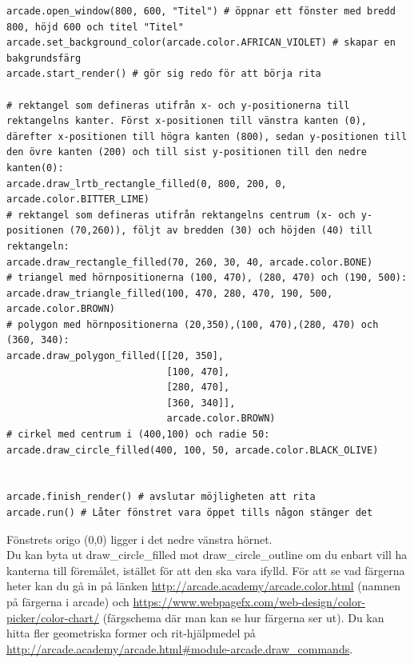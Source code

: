 \documentclass[a4paper,12pt]{article}
\begin{document}
\begin{lstlisting}
arcade.open_window(800, 600, "Titel") # öppnar ett fönster med bredd 800, höjd 600 och titel "Titel"
arcade.set_background_color(arcade.color.AFRICAN_VIOLET) # skapar en bakgrundsfärg
arcade.start_render() # gör sig redo för att börja rita

# rektangel som defineras utifrån x- och y-positionerna till rektangelns kanter. Först x-positionen till vänstra kanten (0), därefter x-positionen till högra kanten (800), sedan y-positionen till den övre kanten (200) och till sist y-positionen till den nedre kanten(0):
arcade.draw_lrtb_rectangle_filled(0, 800, 200, 0, arcade.color.BITTER_LIME)
# rektangel som defineras utifrån rektangelns centrum (x- och y-positionen (70,260)), följt av bredden (30) och höjden (40) till rektangeln:
arcade.draw_rectangle_filled(70, 260, 30, 40, arcade.color.BONE)
# triangel med hörnpositionerna (100, 470), (280, 470) och (190, 500):
arcade.draw_triangle_filled(100, 470, 280, 470, 190, 500, arcade.color.BROWN)
# polygon med hörnpositionerna (20,350),(100, 470),(280, 470) och (360, 340):
arcade.draw_polygon_filled([[20, 350],
                            [100, 470],
                            [280, 470],
                            [360, 340]],
                            arcade.color.BROWN)
# cirkel med centrum i (400,100) och radie 50:
arcade.draw_circle_filled(400, 100, 50, arcade.color.BLACK_OLIVE)


arcade.finish_render() # avslutar möjligheten att rita
arcade.run() # Låter fönstret vara öppet tills någon stänger det
\end{lstlisting}

Fönstrets origo (0,0) ligger i det nedre vänstra hörnet.\\
Du kan byta ut draw\_circle\_filled mot draw\_circle\_outline om du enbart vill ha kanterna till föremålet, istället för att den ska vara ifylld.
För att se vad färgerna heter kan du gå in på länken \url{http://arcade.academy/arcade.color.html} (namnen på färgerna i arcade) och \url{https://www.webpagefx.com/web-design/color-picker/color-chart/} (färgschema där man kan se hur färgerna ser ut). Du kan hitta fler geometriska former och rit-hjälpmedel på \url{http://arcade.academy/arcade.html#module-arcade.draw_commands}.
\end{document}
